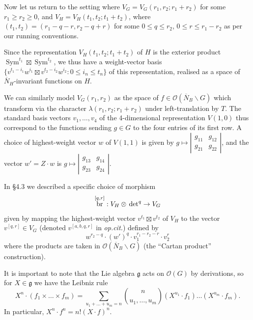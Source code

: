 \documentclass[cjm]{ipart}
\theoremstyle{plain}
\theoremstyle{remark}
\DeclareMathOperator{\br}{br}
\DeclareMathOperator{\Sym}{Sym}
\newcommand{\cO}{\mathcal{O}}
\numberwithin{equation}{subsection}
\renewcommand{\le}{\leqslant}
\renewcommand{\ge}{\geqslant}
\begin{document}
   Now let us return to the setting where $V_G = V_G(r_1, r_2; r_1 + r_2)$ for some $r_1 \ge r_2 \ge 0$, and $V_H = V_H(t_1, t_2; t_1 + t_2)$, where $(t_1, t_2) = (r_1 -q-r, r_2 - q + r)$ for some $0 \le q \le r_2$, $0 \le r \le r_1 - r_2$ as per our running conventions.

   Since the representation $V_H(t_1, t_2; t_1 + t_2)$ of $H$ is the exterior product $\Sym^{t_1} \boxtimes \Sym^{t_2}$, we thus have a weight-vector basis $\{ v^{t_1-i_1} w^{i_1} \boxtimes v^{t_2-i_2} w^{i_2} : 0 \le i_n \le t_n\}$ of this representation, realised as a space of $\overline{N}_H$-invariant functions on $H$.

   We can similarly model $V_G(r_1, r_2)$ as the space of $f \in \cO(\overline{N}_B \backslash G)$ which transform via the character $\lambda(r_1, r_2; r_1 + r_2)$ under left-translation by $T$. The standard basis vectors $v_1, \dots, v_4$ of the 4-dimensional representation $V(1, 0)$ thus correspond to the functions sending $g \in G$ to the four entries of its first row. A choice of highest-weight vector $w$ of $V(1, 1)$ is given by $g \mapsto \left| \begin{smallmatrix} g_{11} & g_{12} \\ g_{21} & g_{22} \end{smallmatrix} \right|$, and the vector $w' = Z \cdot w$ is $g \mapsto \left| \begin{smallmatrix} g_{13} & g_{14} \\ g_{23} & g_{24} \end{smallmatrix} \right|$.

   In \cite{LSZ-asai} \S 4.3 we described a specific choice of morphism
   \[ \br^{[q,r]}: V_H \otimes \sideset{}{^q}\det \to V_G \]
   given by mapping the highest-weight vector $v^{t_1} \boxtimes v^{t_2}$ of $V_H$ to the vector $v^{[q,r]} \in V_G$ (denoted $v^{[a,b,q,r]}$ in \emph{op.cit.}) defined by
   \[ w^{r_2-q} \cdot (w')^q \cdot v_1^{r_1-r_2-r}\cdot v_2^r \]
   where the products are taken in $\cO(\overline{N}_B \backslash G)$ (the ``Cartan product'' construction).

   \begin{note}
    It is important to note that the Lie algebra $\mathfrak{g}$ acts on $\cO(G)$ by derivations, so for $X \in \mathfrak{g}$ we have the Leibniz rule
    \[ X^n \cdot (f_1 \times \dots \times f_m) = \sum_{u_1 + \dots + u_m = n} \binom{n}{u_1, \dots, u_m} (X^{u_1} \cdot f_1) \dots (X^{u_m} \cdot f_m).\]
    In particular, $X^n \cdot f^n = n! (X \cdot f)^n$.
   \end{note}
\end{document}
